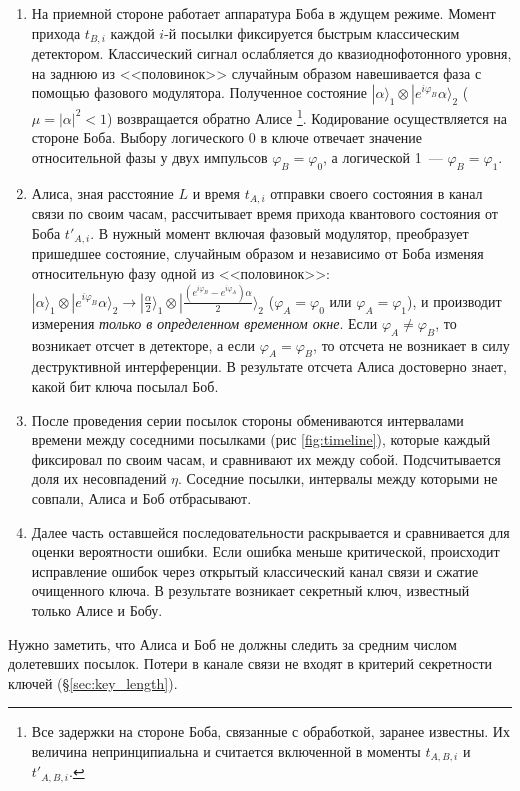 \begin{enumerate}
  \item На приемной стороне работает аппаратура Боба в ждущем режиме. Момент прихода $t_{B,i}$ каждой $i$-й посылки фиксируется быстрым классическим детектором. 
  Классический сигнал ослабляется до квазиоднофотонного уровня, на заднюю из <<половинок>> случайным образом навешивается фаза с помощью фазового модулятора. 
  Полученное состояние $|\alpha\rangle_1 \otimes |e^{i\varphi_B}\alpha\rangle_2$ ($\mu = |\alpha|^2 < 1$) возвращается обратно Алисе 
  \footnote{Все задержки на стороне Боба, связанные с обработкой, заранее известны. Их величина непринципиальна и считается включенной в моменты $t_{A,B,i}$ и $t'_{A,B,i}$.}. 
  Кодирование осуществляется на стороне Боба.
  Выбору логического 0 в ключе отвечает значение относительной фазы у двух импульсов $\varphi_B = \varphi_0$, а логической 1~--- $\varphi_B = \varphi_1$.   
  
  \item Алиса, зная расстояние $L$ и время $t_{A,i}$ отправки своего состояния в канал связи по своим часам, рассчитывает время прихода квантового состояния от Боба $t'_{A,i}$.
  В нужный момент включая фазовый модулятор, преобразует пришедшее состояние, случайным образом и независимо от Боба изменяя относительную фазу одной из <<половинок>>: 
  $|\alpha\rangle_1 \otimes |e^{i\varphi_B}\alpha\rangle_2 \rightarrow |\frac{\alpha}{2}\rangle_1 \otimes |\frac{(e^{i\varphi_B} - e^{i\varphi_A})\alpha}{2}\rangle_2$
  ($\varphi_A = \varphi_0$ или $\varphi_A = \varphi_1$), и производит измерения \textit{только в определенном временном окне}. 
  Если $\varphi_A \neq \varphi_B$, то возникает отсчет в детекторе, а если $\varphi_A = \varphi_B$, то отсчета не возникает в силу деструктивной интерференции. В результате отсчета Алиса достоверно знает, какой бит ключа посылал Боб.
  
  \item После проведения серии посылок стороны обмениваются интервалами времени между соседними посылками (рис \ref{fig:timeline}), которые каждый фиксировал по своим часам, и сравнивают их между собой. Подсчитывается доля их несовпадений $\eta$. Соседние посылки, интервалы между которыми не совпали, Алиса и Боб отбрасывают.
  
  \item Далее часть оставшейся последовательности раскрывается и сравнивается для оценки вероятности ошибки. Если ошибка меньше критической, происходит исправление ошибок через открытый классический канал связи и сжатие очищенного ключа. В результате возникает секретный ключ, известный только Алисе и Бобу.
\end{enumerate}

Нужно заметить, что Алиса и Боб не должны следить за средним числом долетевших посылок. Потери в канале связи не входят в критерий секретности ключей (\S\ref{sec:key_length}).
\clearpage
